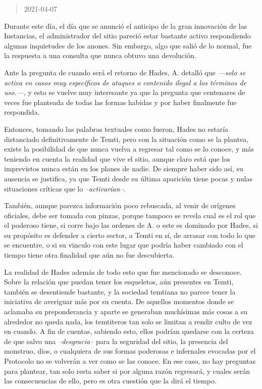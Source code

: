 \documentclass[
  spanish,
]{book}
\begin{document}
\begin{quote}
2021-04-07
\end{quote}

Durante este día, el día que se anunció el anticipo de la gran innovación de las Instancias, el administrador del sitio pareció estar bastante activo respondiendo algunas inquietudes de los anones. Sin embargo, algo que salió de lo normal, fue la respuesta a una consulta que nunca obtuvo una devolución.

Ante la pregunta de cuando será el retorno de Hades, A. detalló que \emph{---solo se activa en casos muy específicos de ataques o contenido ilegal a los términos de uso.---}, y esto se vuelve muy interesante ya que la pregunta que centenares de veces fue planteada de todas las formas habidas y por haber finalmente fue respondida.

Entonces, tomando las palabras textuales como fueron, Hades no estaría distanciado definitivamente de Temti, pero con la situación como se la plantea, existe la posibilidad de que nunca vuelva a regresar tal como se lo conoce, y más teniendo en cuenta la realidad que vive el sitio, aunque claro está que los imprevistos nunca están en los planes de nadie.
De siempre haber sido así, su ausencia se justifica, ya que Temti desde su última aparición tiene pocas y nulas situaciones críticas que lo \emph{--activarían--}.

También, aunque parezca información poco rebuscada, al venir de orígenes oficiales, debe ser tomada con pinzas, porque tampoco se revela cual es el rol que el poderoso tiene, si corre bajo las ordenes de A. o este es dominado por Hades, si su propósito es defender a cierto sector, a Temti en sí, de arrasar con todo lo que se encuentre, o si su vinculo con este lugar que podría haber cambiado con el tiempo tiene otra finalidad que aún no fue descubierta.

La realidad de Hades además de todo esto que fue mencionado se desconoce. Sobre la relación que puedan tener los esqueletos, aún presentes en Temti, también se desentiende bastante, y la sociedad temtiana no parece tener la iniciativa de averiguar más por su cuenta. De aquellos momentos donde se aclamaba su preponderancia y aparte se generaban muchísimas más cosas a su alrededor no queda nada, los temtiteros tan solo se limitan a rendir culto de vez en cuando.
A fin de cuentas, sabiendo esto, ellos podrían quedarse con la certeza de que salvo una \emph{--desgracia--} para la seguridad del sitio, la presencia del monstruo, dios, o cualquiera de sus formas poderosas e infernales evocadas por el Protocolo no se volverán a ver como se las conoce. En ese caso, no hay preguntas para plantear, tan solo resta saber si por alguna razón regresará, y cuales serán las consecuencias de ello, pero es otra cuestión que la dirá el tiempo.
\end{document}
